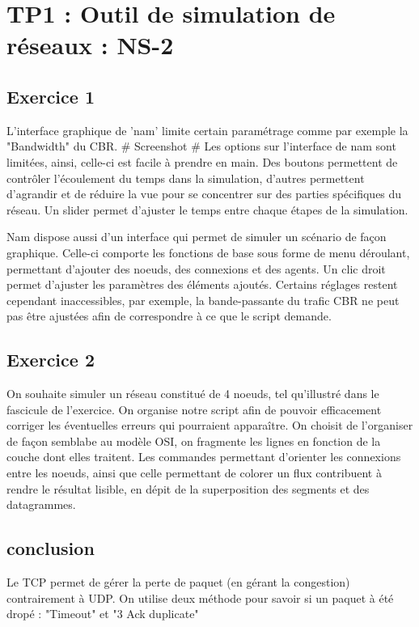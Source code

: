 \chapter{TP1 : Outil de simulation de réseaux : NS-2}
    \section{Exercice 1}
        L'interface graphique de 'nam' limite certain paramétrage comme par exemple la "Bandwidth" du CBR.
        {# Screenshot #}
        Les options sur l'interface de nam sont limitées, ainsi, celle-ci est facile à prendre en main. Des boutons permettent de contrôler l'écoulement du temps dans la simulation, d'autres permettent d'agrandir et de réduire la vue pour se concentrer sur des parties spécifiques du réseau. Un slider permet d'ajuster le temps entre chaque étapes de la simulation.

        Nam dispose aussi d'un interface qui permet de simuler un scénario de façon graphique. Celle-ci comporte les fonctions de base sous forme de menu déroulant, permettant d'ajouter des noeuds, des connexions et des agents. Un clic droit permet d'ajuster les paramètres des éléments ajoutés.
        Certains réglages restent cependant inaccessibles, par exemple, la bande-passante du trafic CBR ne peut pas être ajustées afin de correspondre à ce que le script demande.
    \section{Exercice 2}
        On souhaite simuler un réseau constitué de 4 noeuds, tel qu'illustré dans le fascicule de l'exercice. On organise notre script afin de pouvoir efficacement corriger les éventuelles erreurs qui pourraient apparaître. On choisit de l'organiser de façon semblabe au modèle OSI, on fragmente les lignes en fonction de la couche dont elles traitent.
        Les commandes permettant d'orienter les connexions entre les noeuds, ainsi que celle permettant de colorer un flux contribuent à rendre le résultat lisible, en dépit de la superposition des segments et des datagrammes.

    \section{conclusion}
        Le TCP permet de gérer la perte de paquet (en gérant la congestion) contrairement à UDP.
        On utilise deux méthode pour savoir si un paquet à été dropé : "Timeout" et "3 Ack duplicate"

